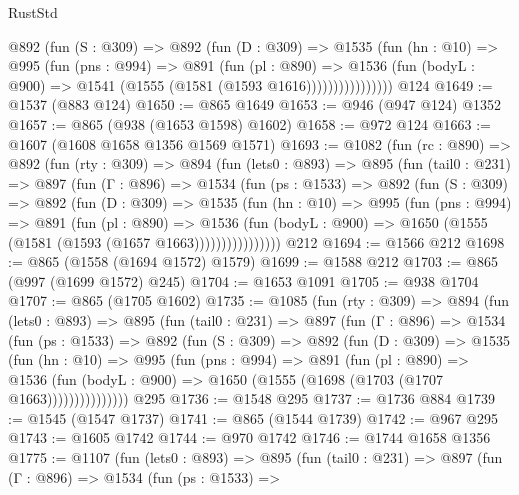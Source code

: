 \begin{lexlean}{RustStd}
\begin{coremodule}
                @892
                  (fun (S : @309) =>
                  @892
                    (fun (D : @309) =>
                    @1535
                      (fun (hn : @10) =>
                      @995
                        (fun (pns : @994) =>
                        @891
                          (fun (pl : @890) =>
                          @1536
                            (fun (bodyL : @900) => @1541 (@1555 (@1581 (@1593 @1616))))))))))))))))
    @124
@1649 := @1537 (@883 @124)
@1650 := @865 @1649
@1653 := @946 (@947 @124) @1352
@1657 := @865 (@938 (@1653 @1598) @1602)
@1658 := @972 @124
@1663 := @1607 (@1608 @1658 @1356 @1569 @1571)
@1693 := @1082
    (fun (rc : @890) =>
    @892
      (fun (rty : @309) =>
      @894
        (fun (lets0 : @893) =>
        @895
          (fun (tail0 : @231) =>
          @897
            (fun (Γ : @896) =>
            @1534
              (fun (ps : @1533) =>
              @892
                (fun (S : @309) =>
                @892
                  (fun (D : @309) =>
                  @1535
                    (fun (hn : @10) =>
                    @995
                      (fun (pns : @994) =>
                      @891
                        (fun (pl : @890) =>
                        @1536
                          (fun (bodyL : @900) =>
                          @1650 (@1555 (@1581 (@1593 (@1657 @1663))))))))))))))))
    @212
@1694 := @1566 @212
@1698 := @865 (@1558 (@1694 @1572) @1579)
@1699 := @1588 @212
@1703 := @865 (@997 (@1699 @1572) @245)
@1704 := @1653 @1091
@1705 := @938 @1704
@1707 := @865 (@1705 @1602)
@1735 := @1085
    (fun (rty : @309) =>
    @894
      (fun (lets0 : @893) =>
      @895
        (fun (tail0 : @231) =>
        @897
          (fun (Γ : @896) =>
          @1534
            (fun (ps : @1533) =>
            @892
              (fun (S : @309) =>
              @892
                (fun (D : @309) =>
                @1535
                  (fun (hn : @10) =>
                  @995
                    (fun (pns : @994) =>
                    @891
                      (fun (pl : @890) =>
                      @1536
                        (fun (bodyL : @900) =>
                        @1650 (@1555 (@1698 (@1703 (@1707 @1663)))))))))))))))
    @295
@1736 := @1548 @295
@1737 := @1736 @884
@1739 := @1545 (@1547 @1737)
@1741 := @865 (@1544 @1739)
@1742 := @967 @295
@1743 := @1605 @1742
@1744 := @970 @1742
@1746 := @1744 @1658 @1356
@1775 := @1107
    (fun (lets0 : @893) =>
    @895
      (fun (tail0 : @231) =>
      @897
        (fun (Γ : @896) =>
        @1534
          (fun (ps : @1533) =>

\end{coremodule}
\end{lexlean}
